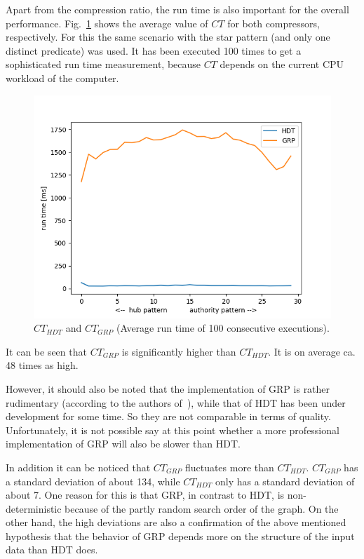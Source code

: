 Apart from the compression ratio, the run time is also important for the overall performance. Fig.~\ref{fig:runtimes} shows the average value of $CT$ for both compressors, respectively. For this the same scenario with the star pattern (and only one distinct predicate) was used. It has been executed 100 times to get a sophisticated run time measurement, because $CT$ depends on the current CPU workload of the computer.

\begin{figure}
	\centering
	\includegraphics[width=0.7\linewidth]{figures/GRPvsHDT/runtimes}
	\caption{$CT_{HDT}$ and $CT_{GRP}$ (Average run time of 100 consecutive executions).}
	\label{fig:runtimes}
\end{figure}


It can be seen that $CT_{GRP}$ is significantly higher than $CT_{HDT}$. It is on average ca. 48 times as high.

However, it should also be noted that the implementation of GRP is rather rudimentary  (according to the authors of~\cite{maneth}), while that of HDT has been under development for some time. So they are not comparable in terms of quality. Unfortunately, it is not possible say at this point whether a more professional implementation of GRP will also be slower than HDT.

In addition it can be noticed that $CT_{GRP}$ fluctuates more than $CT_{HDT}$. $CT_{GRP}$ has a standard deviation of about 134, while $CT_{HDT}$ only has a standard deviation of about 7. One reason for this is that GRP, in contrast to HDT, is non-deterministic because of the partly random search order of the graph. On the other hand, the high deviations are also a confirmation of the above mentioned hypothesis that the behavior of GRP depends more on the structure of the input data than HDT does.



